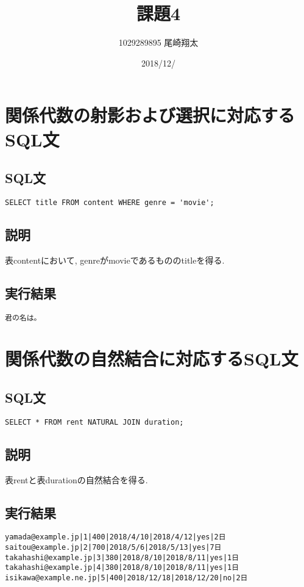 \documentclass{jarticle}
\begin{document}
\title{課題4}
\author{1029289895 尾崎翔太}
\date{2018/12/}

\maketitle
\newpage

\section{関係代数の射影および選択に対応するSQL文}
\subsection{SQL文}
\begin{verbatim}
SELECT title FROM content WHERE genre = 'movie';
\end{verbatim}
\subsection{説明}
表contentにおいて, genreがmovieであるもののtitleを得る.
\subsection{実行結果}
\begin{verbatim}
君の名は。
\end{verbatim}
\section{関係代数の自然結合に対応するSQL文}
\subsection{SQL文}
\begin{verbatim}
SELECT * FROM rent NATURAL JOIN duration;
\end{verbatim}
\subsection{説明}
表rentと表durationの自然結合を得る.
\subsection{実行結果}
\begin{verbatim}
yamada@example.jp|1|400|2018/4/10|2018/4/12|yes|2日
saitou@example.jp|2|700|2018/5/6|2018/5/13|yes|7日
takahashi@example.jp|3|380|2018/8/10|2018/8/11|yes|1日
takahashi@example.jp|4|380|2018/8/10|2018/8/11|yes|1日
isikawa@example.ne.jp|5|400|2018/12/18|2018/12/20|no|2日
\end{verbatim}
\end{document}
